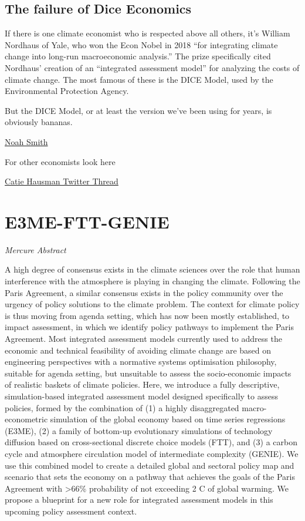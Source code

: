 \documentclass[
]{book}
\begin{document}
\hypertarget{the-failure-of-dice-economics}{%
\subsection{The failure of Dice Economics}\label{the-failure-of-dice-economics}}

If there is one climate economist who is respected above all others, it's William Nordhaus of Yale, who won the Econ Nobel in 2018 ``for integrating climate change into long-run macroeconomic analysis.'' The prize specifically cited Nordhaus' creation of an ``integrated assessment model'' for analyzing the costs of climate change. The most famous of these is the DICE Model, used by the Environmental Protection Agency.

But the DICE Model, or at least the version we've been using for years, is obviously bananas.

\href{https://noahpinion.substack.com/p/why-has-climate-economics-failed}{Noah Smith}

For other economists look here

\href{https://twitter.com/CatieHausman/status/1381999336423362568}{Catie Hausman Twitter Thread}

\hypertarget{e3me-ftt-genie}{%
\section{E3ME-FTT-GENIE}\label{e3me-ftt-genie}}

\emph{Mercure Abstract}

A high degree of consensus exists in the climate sciences over the role that human interference with the
atmosphere is playing in changing the climate. Following the Paris Agreement, a similar consensus exists
in the policy community over the urgency of policy solutions to the climate problem. The context for
climate policy is thus moving from agenda setting, which has now been mostly established, to impact
assessment, in which we identify policy pathways to implement the Paris Agreement. Most integrated
assessment models currently used to address the economic and technical feasibility of avoiding climate
change are based on engineering perspectives with a normative systems optimisation philosophy,
suitable for agenda setting, but unsuitable to assess the socio-economic impacts of realistic baskets of
climate policies. Here, we introduce a fully descriptive, simulation-based integrated assessment model
designed speciﬁcally to assess policies, formed by the combination of (1) a highly disaggregated macro-
econometric simulation of the global economy based on time series regressions (E3ME), (2) a family of
bottom-up evolutionary simulations of technology diffusion based on cross-sectional discrete choice
models (FTT), and (3) a carbon cycle and atmosphere circulation model of intermediate complexity
(GENIE). We use this combined model to create a detailed global and sectoral policy map and scenario
that sets the economy on a pathway that achieves the goals of the Paris Agreement with \textgreater66\% probability
of not exceeding 2 C of global warming. We propose a blueprint for a new role for integrated assessment
models in this upcoming policy assessment context.
\end{document}
